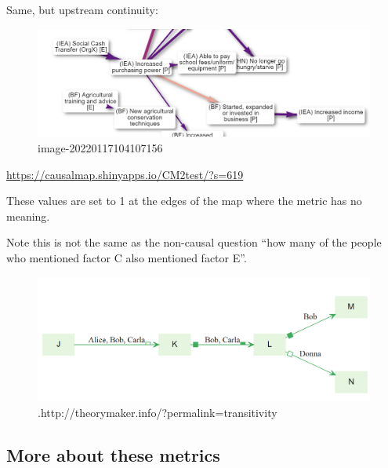 \documentclass[
]{book}
\begin{document}
Same, but upstream continuity:

\begin{figure}
\centering
\includegraphics[width=6.77083in,height=\textheight]{_assets/image-20220117104107156.png}
\caption{image-20220117104107156}
\end{figure}

\url{https://causalmap.shinyapps.io/CM2test/?s=619}

These values are set to 1 at the edges of the map where the metric has no meaning.

Note this is not the same as the non-causal question ``how many of the people who mentioned factor C also mentioned factor E''.

\begin{figure}
\centering
\includegraphics[width=6.77083in,height=\textheight]{_assets/image-20211222121147473.png}
\caption{.http://theorymaker.info/?permalink=transitivity}
\end{figure}

\hypertarget{more-about-these-metrics}{%
\subsection{More about these metrics}\label{more-about-these-metrics}}
\end{document}
